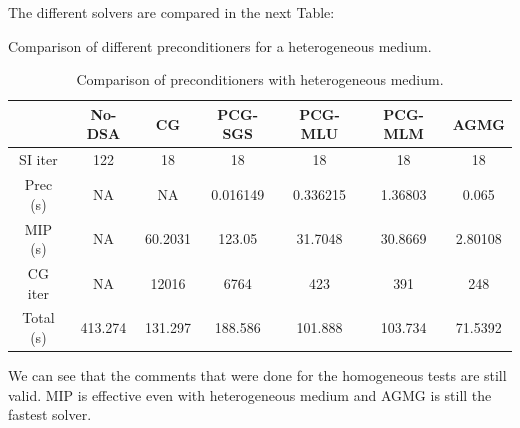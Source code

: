 The different solvers are compared in the next Table:
\begin{table}[H]
  \begin{center}
    \caption{Comparison of different preconditioners for a heterogeneous medium.}
    \begin{tabular}{|c|c|c|c|c|c|c|}
      \hline
      & No-DSA & CG & PCG-SGS & PCG-MLU & PCG-MLM & AGMG\\
      \hline
      SI iter   & 122      & 18      & 18       & 18       & 18      & 18 \\
      Prec (s)  & NA       & NA      & 0.016149 & 0.336215 & 1.36803 & 0.065 \\
      MIP (s)   & NA       & 60.2031 & 123.05   & 31.7048  & 30.8669 & 2.80108\\
      CG iter   & NA       & 12016   & 6764     & 423      & 391     & 248 \\
      Total (s) & 413.274  & 131.297 & 188.586  & 101.888  & 103.734 & 71.5392\\
      \hline
    \end{tabular}
    \caption{Comparison of preconditioners with heterogeneous medium.}
  \end{center}
\end{table}
We can see that the comments that were done for the homogeneous tests are
still valid. MIP is effective even with heterogeneous medium and AGMG is
still the fastest solver.

